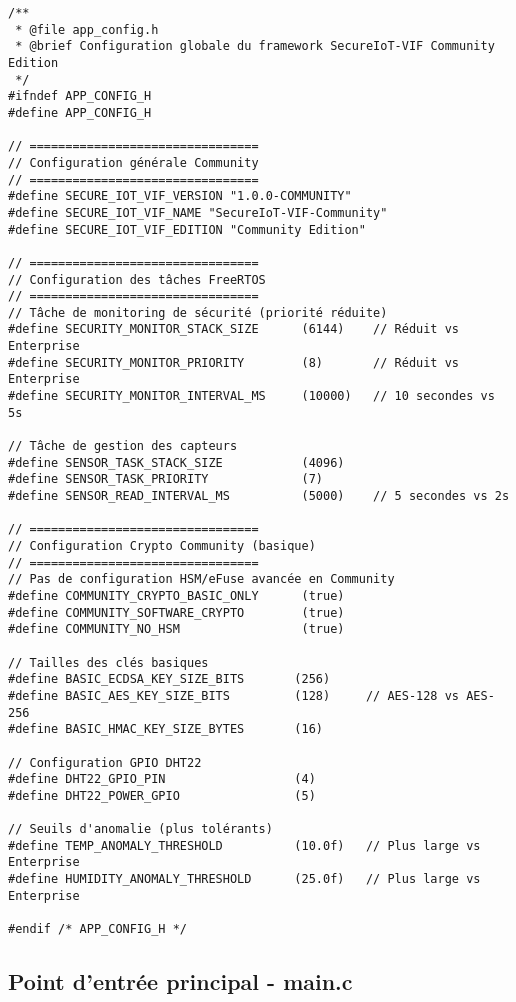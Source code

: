 \lstset{language=C}
\begin{lstlisting}[caption={Configuration principale SecureIoT-VIF Community Edition}]
/**
 * @file app_config.h
 * @brief Configuration globale du framework SecureIoT-VIF Community Edition
 */
#ifndef APP_CONFIG_H
#define APP_CONFIG_H

// ================================
// Configuration générale Community
// ================================
#define SECURE_IOT_VIF_VERSION "1.0.0-COMMUNITY"
#define SECURE_IOT_VIF_NAME "SecureIoT-VIF-Community"
#define SECURE_IOT_VIF_EDITION "Community Edition"

// ================================
// Configuration des tâches FreeRTOS
// ================================
// Tâche de monitoring de sécurité (priorité réduite)
#define SECURITY_MONITOR_STACK_SIZE      (6144)    // Réduit vs Enterprise
#define SECURITY_MONITOR_PRIORITY        (8)       // Réduit vs Enterprise 
#define SECURITY_MONITOR_INTERVAL_MS     (10000)   // 10 secondes vs 5s

// Tâche de gestion des capteurs
#define SENSOR_TASK_STACK_SIZE           (4096)
#define SENSOR_TASK_PRIORITY             (7)
#define SENSOR_READ_INTERVAL_MS          (5000)    // 5 secondes vs 2s

// ================================
// Configuration Crypto Community (basique)
// ================================
// Pas de configuration HSM/eFuse avancée en Community
#define COMMUNITY_CRYPTO_BASIC_ONLY      (true)
#define COMMUNITY_SOFTWARE_CRYPTO        (true)
#define COMMUNITY_NO_HSM                 (true)

// Tailles des clés basiques
#define BASIC_ECDSA_KEY_SIZE_BITS       (256)
#define BASIC_AES_KEY_SIZE_BITS         (128)     // AES-128 vs AES-256
#define BASIC_HMAC_KEY_SIZE_BYTES       (16)

// Configuration GPIO DHT22
#define DHT22_GPIO_PIN                  (4)
#define DHT22_POWER_GPIO                (5)

// Seuils d'anomalie (plus tolérants)
#define TEMP_ANOMALY_THRESHOLD          (10.0f)   // Plus large vs Enterprise
#define HUMIDITY_ANOMALY_THRESHOLD      (25.0f)   // Plus large vs Enterprise

#endif /* APP_CONFIG_H */
\end{lstlisting}

\subsection{Point d'entrée principal - main.c}

